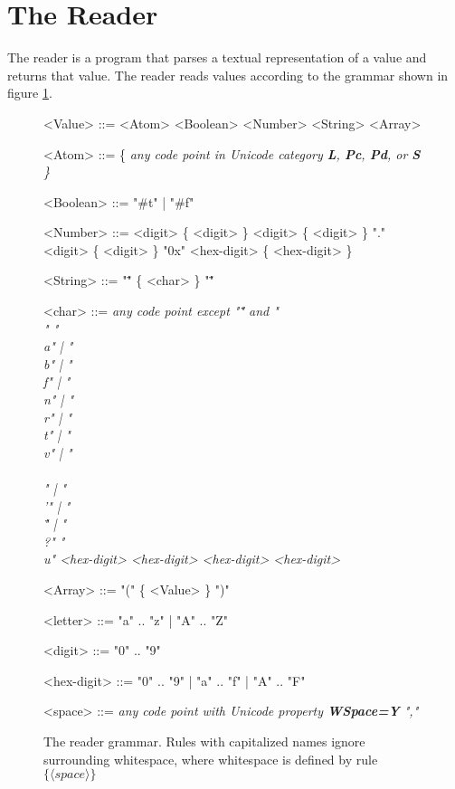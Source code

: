 \documentclass[a4paper]{article}
\begin{document}
\section{The Reader}

The reader is a program that parses a textual representation of a value and returns that value. The reader reads values according to the grammar shown in figure \ref{fig:readergrammar}.

\begin{figure}
\label{fig:readergrammar}
\caption{The reader grammar. Rules with capitalized names ignore surrounding whitespace, where whitespace is defined by rule $\{ \langle space \rangle \}$}
\begin{grammar}
<Value> ::= <Atom>
\alt <Boolean>
\alt <Number>
\alt <String>
\alt <Array>

<Atom> ::= \{ \it{any code point in Unicode category {\bf L}, {\bf Pc}, {\bf Pd}, or {\bf S}} \}

<Boolean> ::= "#t" | "#f"

<Number> ::= <digit> \{ <digit> \}
\alt <digit> \{ <digit> \} "." <digit> \{ <digit> \}
\alt "0x" <hex-digit> \{ <hex-digit> \}

<String> ::= "\"" \{ <char> \} "\""

<char> ::= \it{any code point except "\"" and "\\"}
\alt "\\a" | "\\b" | "\\f" | "\\n" | "\\r" | "\\t" | "\\v" | "\\\\" | "\\'" | "\\\"" | "\\?"
\alt "\\u" <hex-digit> <hex-digit> <hex-digit> <hex-digit>

<Array> ::= "(" \{ <Value> \} ")"

<letter> ::= "a" .. "z" | "A" .. "Z"

<digit> ::= "0" .. "9"

<hex-digit> ::= "0" .. "9" | "a" .. "f" | "A" .. "F"

<space> ::= \it{any code point with Unicode property {\bf WSpace=Y}}
\alt ","

\end{grammar}
\end{figure}
\end{document}
